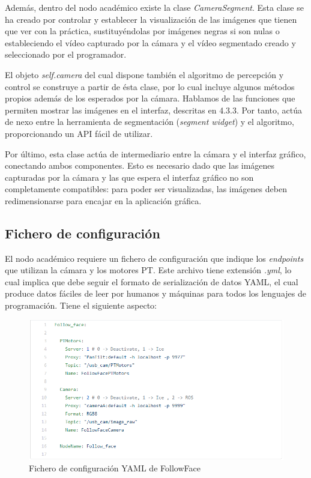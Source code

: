 Además, dentro del nodo académico existe la clase \textit{CameraSegment}. Esta clase se ha creado por controlar y establecer la visualización de las imágenes que tienen que ver con la práctica, sustituyéndolas por imágenes negras si son nulas o estableciendo el vídeo capturado por la cámara y el vídeo segmentado creado y seleccionado por el programador.

El objeto \textit{self.camera} del cual dispone también el algoritmo de percepción y control se construye a partir de ésta clase, por lo cual incluye algunos métodos propios además de los esperados por la cámara. Hablamos de las funciones que permiten mostrar las imágenes en el interfaz, descritas en 4.3.3. Por tanto, actúa de nexo entre la herramienta de segmentación (\textit{segment widget}) y el algoritmo, proporcionando un API fácil de utilizar.

Por último, esta clase actúa de intermediario entre la cámara y el interfaz gráfico, conectando ambos componentes. Esto es necesario dado que las imágenes capturadas por la cámara y las que espera el interfaz gráfico no son completamente compatibles: para poder ser visualizadas, las imágenes deben redimensionarse para encajar en la aplicación gráfica.

\subsection{Fichero de configuración}
El nodo académico requiere un fichero de configuración que indique los \textit{endpoints} que utilizan la cámara y los motores PT. Este archivo tiene extensión \textit{.yml}, lo cual implica que debe seguir el formato de serialización de datos YAML, el cual produce datos fáciles de leer por humanos y máquinas para todos los lenguajes de programación. Tiene el siguiente aspecto:

\begin{figure}[H]
  \begin{center}
    \includegraphics[width=0.99\linewidth]{figures/ymlfollowface.png}
		\caption{Fichero de configuración YAML de FollowFace}
		\label{fig.followfaceconf}
		\end{center}
\end{figure}

